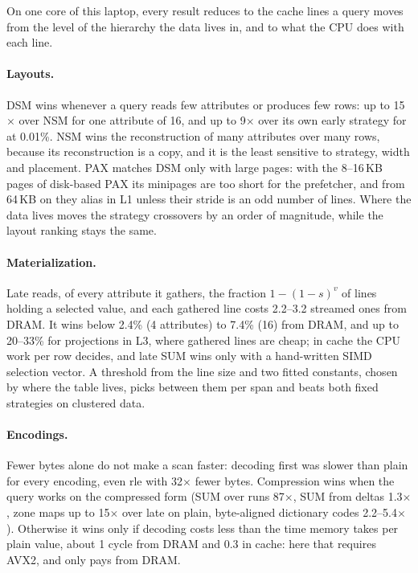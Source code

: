On one core of this laptop, every result reduces to the cache lines a query moves from the
level of the hierarchy the data lives in, and to what the CPU does with each line.

\paragraph{Layouts.} DSM wins whenever a query reads few attributes or produces few rows: up to
15$\times$ over NSM for one attribute of 16, and up to 9$\times$ over its own early strategy for
 at 0.01\%. NSM wins the reconstruction of many attributes over many rows,
because its reconstruction is a copy, and it is the least sensitive to strategy, width and
placement. PAX matches DSM only with large pages: with the 8--16\,KB pages of disk-based PAX its
minipages are too short for the prefetcher, and from 64\,KB on they alias in L1 unless their
stride is an odd number of lines. Where the data lives moves the strategy crossovers by an order
of magnitude, while the layout ranking stays the same.

\paragraph{Materialization.} Late reads, of every attribute it gathers, the fraction
$1-(1-s)^v$ of lines holding a selected value, and each gathered line costs 2.2--3.2 streamed
ones from DRAM. It wins below 2.4\% (4 attributes) to 7.4\% (16) from DRAM, and up to 20--33\%
for projections in L3, where gathered lines are cheap; in cache the CPU work per row decides,
and late SUM wins only with a hand-written SIMD selection vector. A threshold from the line size
and two fitted constants, chosen by where the table lives, picks between them per span and beats
both fixed strategies on clustered data.

\paragraph{Encodings.} Fewer bytes alone do not make a scan faster: decoding first was slower
than plain for every encoding, even rle with 32$\times$ fewer bytes. Compression wins when the
query works on the compressed form (SUM over runs 87$\times$, SUM from deltas 1.3$\times$, zone
maps up to 15$\times$ over late on plain, byte-aligned dictionary codes 2.2--5.4$\times$).
Otherwise it wins only if decoding costs less than the time memory takes per plain value, about
1 cycle from DRAM and 0.3 in cache: here that requires AVX2, and only pays from DRAM.

